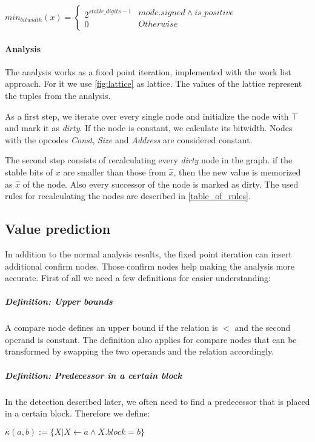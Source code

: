 $
min_{bitwidth}(x)=
\left\{
\begin{array}{l}2^{stable\_digits-1}\\0\end{array}
\begin{array}{l} {mode.signed \wedge is\_positive} \\ {Otherwise} \end{array}
\right.
$



\paragraph{Analysis}
\label{analysis_explain}
The analysis works as a fixed point iteration, implemented with the work list approach. For it we use  \autoref{fig:lattice} as lattice. The values of the lattice represent the tuples from the analysis.

As a first step, we iterate over every single node and initialize the node with $\top$ and mark it as \textit{dirty}. If the node is constant, we calculate its bitwidth. Nodes with the opcodes \textit{Const}, \textit{Size} and \textit{Address} are considered constant.

The second step consists of recalculating every \textit{dirty} node in the graph. 
if the stable bits of $x$ are smaller than those from $\hat{x}$, 
then the new value is memorized as $\hat{x}$ of the node. Also every successor of the node is marked as dirty. The used rules for recalculating the nodes are described in \autoref{table_of_rules}.

\subsection{Value prediction}
In addition to the normal analysis results, the fixed point iteration can insert additional confirm nodes. Those confirm nodes help making the analysis more accurate.
First of all we need a few definitions for easier understanding:



\subparagraph{Definition: Upper bounds}
A compare node defines an upper bound if the relation is $<$ and the second operand is constant.\newline
The definition also applies for compare nodes that can be transformed by swapping the two operands and the relation accordingly.

\subparagraph{Definition: Predecessor in a certain block}
In the detection described later, we often need to find a predecessor that is placed in a certain block. Therefore we define:
\begin{center}
$\kappa(a, b) := \{X| X \leftarrow a \wedge X.block = b \}$ 
\end{center}

